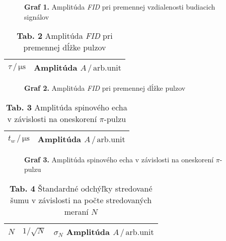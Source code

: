 \documentclass[a4paper, 10pt]{article}
\newcommand{\unit}[1]{\ensuremath{\, \mathrm{#1}}}
\begin{document}
\begin{figure}[h!]
\centering
\vspace*{-15pt}

\textbf{Graf 1.} Amplitúda \textit{FID} pri premennej vzdialenosti budiacich signálov
\end{figure}


\begin{table}[h!]
\centering
\hspace*{60pt}
\begin{tabular}{c|c}
$ \tau\,/\unit{\mu s} $ & 
 Amplitúda $ A\,/\unit{arb. unit} $
\\
\midrule 

\end{tabular}
\newline
\vspace*{2pt}
\caption*{\textbf{ Tab. 2}  Amplitúda \textit{FID} pri premennej dĺžke pulzov}
\end{table}

\begin{figure}[h!]
\centering
\vspace*{-15pt}

\textbf{Graf 2.} Amplitúda \textit{FID} pri premennej dĺžke pulzov
\end{figure}


\begin{table}[h!]
\centering
\hspace*{60pt}
\begin{tabular}{c|c}
$t_w\,/\unit{\mu s} $ & 
 Amplitúda $ A\,/\unit{arb. unit} $
\\
\midrule 

\end{tabular}
\newline
\vspace*{2pt}
\caption*{\textbf{ Tab. 3}  Amplitúda spinového echa v závislosti na oneskorení $\pi$-pulzu}
\end{table}

\begin{figure}[h!]
\centering
\vspace*{-15pt}

\textbf{Graf 3.} Amplitúda spinového echa v závislosti na oneskorení $\pi$-pulzu
\end{figure}

\begin{table}[h!]
\centering
\hspace*{60pt}
\begin{tabular}{c|c|c}
$N$ & $1/\sqrt N$ & $\sigma_N$
 Amplitúda $ A\,/\unit{arb. unit} $
\\
\midrule 

\end{tabular}
\newline
\vspace*{2pt}
\caption*{\textbf{ Tab. 4}  Štandardné odchýľky stredované šumu v závislosti na počte stredovaných meraní $N$}
\end{table}
\end{document}
